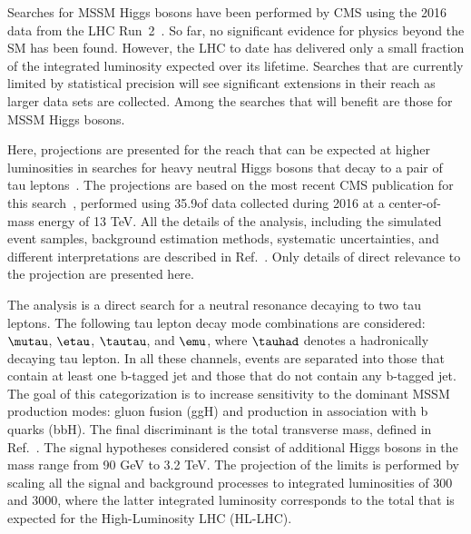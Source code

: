 Searches for MSSM Higgs bosons have been performed by CMS using
the 2016 data from the LHC Run~2~\cite{HIG-18-014,HIG-16-018,HIG-17-020}.
So far,
no significant evidence for physics beyond the SM has been found.
However, the LHC to date has delivered only a small fraction of the
integrated luminosity expected over its lifetime.
Searches that are currently limited by statistical precision
will see significant extensions in their reach as larger data sets are collected.
Among the searches that will benefit are those for MSSM Higgs bosons.

Here,
projections are presented for the reach that can be expected at higher luminosities
in searches for heavy neutral Higgs bosons that decay to a pair of tau leptons~\cite{CMS-PAS-FTR-18-017}.
The projections are based on the most recent CMS publication
for this search~\cite{HIG-17-020},
performed using 35.9\fbinv of data collected during 2016
at a center-of-mass energy of 13 TeV.
All the details of the analysis,
including the simulated event samples, background estimation methods,
systematic uncertainties, and different interpretations are described in Ref.~\cite{HIG-17-020}.
Only details of direct relevance to the projection are presented here.

The analysis is a direct search for a neutral resonance
decaying to two tau leptons.
The following tau lepton decay mode combinations are considered: $\mutau$, $\etau$,
$\tautau$, and $\emu$, where $\tauhad$ denotes a hadronically decaying tau lepton.
In all these channels, events are separated into those that contain
at least one b-tagged jet and those that do not contain any b-tagged jet. 
The goal of this categorization is to increase sensitivity to the dominant MSSM production modes: 
gluon fusion (ggH) and production in association with b quarks (bbH).
The final discriminant is the total 
transverse mass, defined in Ref.~\cite{HIG-17-020}.
The signal hypotheses considered consist of additional Higgs
bosons in the mass range from 90 GeV to 3.2 TeV.
The projection of the limits %
is performed by scaling all the signal
and background processes to integrated luminosities
of 300 and 3000\fbinv,
where the latter integrated luminosity corresponds to the total that is
expected for the High-Luminosity LHC (HL-LHC). 

